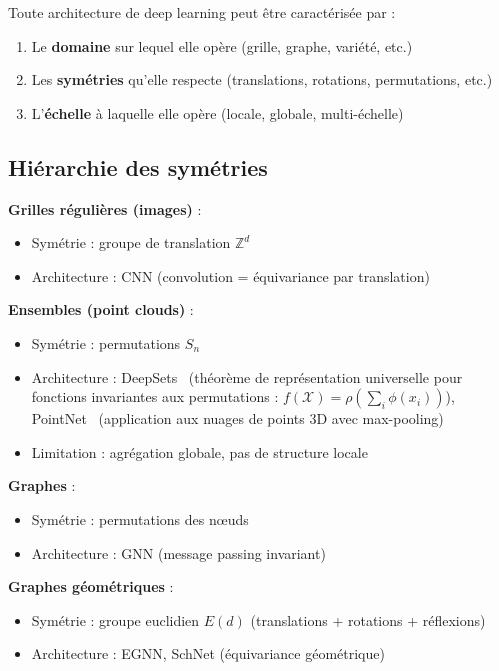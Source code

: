 Toute architecture de deep learning peut être caractérisée par :
\begin{enumerate}
    \item Le \textbf{domaine} sur lequel elle opère (grille, graphe, variété, etc.)
    \item Les \textbf{symétries} qu'elle respecte (translations, rotations, permutations, etc.)
    \item L'\textbf{échelle} à laquelle elle opère (locale, globale, multi-échelle)
\end{enumerate}

\subsection{Hiérarchie des symétries}

\textbf{Grilles régulières (images)} :
\begin{itemize}
    \item Symétrie : groupe de translation $\mathbb{Z}^d$
    \item Architecture : CNN (convolution = équivariance par translation)
\end{itemize}

\textbf{Ensembles (point clouds)} :
\begin{itemize}
    \item Symétrie : permutations $S_n$
    \item Architecture : DeepSets~\cite{Zaheer2017} (théorème de représentation universelle pour fonctions invariantes aux permutations : $f(\mathcal{X}) = \rho(\sum_i \phi(x_i))$), PointNet~\cite{Qi2017} (application aux nuages de points 3D avec max-pooling)
    \item Limitation : agrégation globale, pas de structure locale
\end{itemize}

\textbf{Graphes} :
\begin{itemize}
    \item Symétrie : permutations des nœuds
    \item Architecture : GNN (message passing invariant)
\end{itemize}

\textbf{Graphes géométriques} :
\begin{itemize}
    \item Symétrie : groupe euclidien $E(d)$ (translations + rotations + réflexions)
    \item Architecture : EGNN, SchNet (équivariance géométrique)
\end{itemize}

